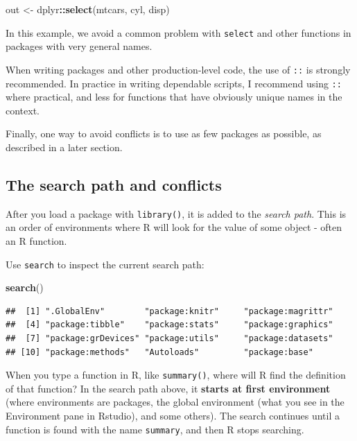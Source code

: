 \documentclass[]{book}
\newenvironment{Shaded}{\begin{snugshade}}{\end{snugshade}}
\newcommand{\KeywordTok}[1]{\textcolor[rgb]{0.13,0.29,0.53}{\textbf{#1}}}
\newcommand{\NormalTok}[1]{#1}
\newcommand{\OperatorTok}[1]{\textcolor[rgb]{0.81,0.36,0.00}{\textbf{#1}}}
\newcommand{\StringTok}[1]{\textcolor[rgb]{0.31,0.60,0.02}{#1}}
\begin{document}
\begin{Shaded}
\begin{Highlighting}[]
\NormalTok{out <-}\StringTok{ }\NormalTok{dplyr}\OperatorTok{::}\KeywordTok{select}\NormalTok{(mtcars, cyl, disp)}
\end{Highlighting}
\end{Shaded}

In this example, we avoid a common problem with \texttt{select} and other functions in packages with very general names.

When writing packages and other production-level code, the use of \texttt{::} is strongly recommended. In practice in writing dependable scripts, I recommend using \texttt{::} where practical, and less for functions that have obviously unique names in the context.

Finally, one way to avoid conflicts is to use as few packages as possible, as described in a later section.

\hypertarget{the-search-path-and-conflicts}{%
\subsection{The search path and conflicts}\label{the-search-path-and-conflicts}}

After you load a package with \texttt{library()}, it is added to the \emph{search path}. This is an order of environments where R will look for the value of some object - often an R function.

Use \texttt{search} to inspect the current search path:

\begin{Shaded}
\begin{Highlighting}[]
\KeywordTok{search}\NormalTok{()}
\end{Highlighting}
\end{Shaded}

\begin{verbatim}
##  [1] ".GlobalEnv"        "package:knitr"     "package:magrittr" 
##  [4] "package:tibble"    "package:stats"     "package:graphics" 
##  [7] "package:grDevices" "package:utils"     "package:datasets" 
## [10] "package:methods"   "Autoloads"         "package:base"
\end{verbatim}

When you type a function in R, like \texttt{summary()}, where will R find the definition of that function? In the search path above, it \textbf{starts at first environment} (where environments are packages, the global environment (what you see in the Environment pane in Rstudio), and some others). The search continues until a function is found with the name \texttt{summary}, and then R stops searching.
\end{document}
